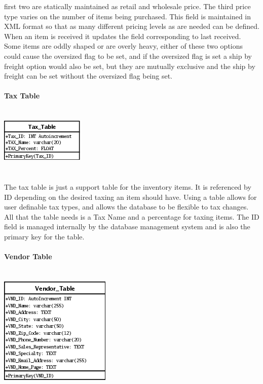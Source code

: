 \documentclass{report}
\begin{document}
        first two are statically maintained as retail and wholesale price. The third price
        type varies on the number of items being purchased. This field is maintained in XML
        format so that as many different pricing levels as are needed can be defined. When an
        item is received it updates the field corresponding to last received. Some items are
        oddly shaped or are overly heavy, either of these two options could cause the oversized
        flag to be set, and if the oversized flag is set a ship by freight option would also be
        set, but they are mutually exclusive and the ship by freight can be set without the
        oversized flag being set.\\
        \\
        {\bf Tax Table}\\
        \\
        \\
        \includegraphics{Tables/TaxTable.png}\\
        \\
        \\
        The tax table is just a support table for the inventory items. It is referenced by ID
        depending on the desired taxing an item should have. Using a table allows for user definable
        tax types, and allows the database to be flexible to tax changes. All that the table needs
        is a Tax Name and a percentage for taxing items. The ID field is managed internally by the
        database management system and is also the primary key for the table.\\
        \\
        {\bf Vendor Table}\\
        \\
        \\
        \includegraphics{Tables/VendorTable.png}\\
\end{document}
